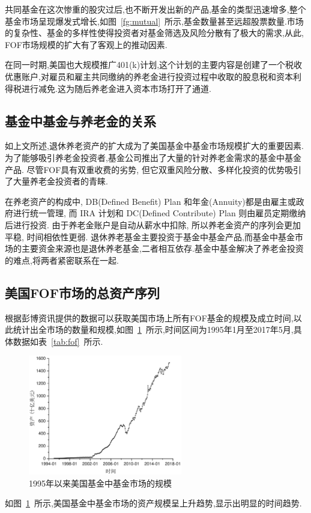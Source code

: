 共同基金在这次惨重的股灾过后,也不断开发出新的产品,基金的类型迅速增多,整个基金市场呈现爆发式增长,如图~\ref{fg:mutual}~所示,基金数量甚至远超股票数量.市场的复杂性、基金的多样性使得投资者对基金筛选及风险分散有了极大的需求,从此, FOF市场规模的扩大有了客观上的推动因素.

在同一时期,美国也大规模推广401(k)计划,这个计划的主要内容是创建了一个税收优惠账户,对雇员和雇主共同缴纳的养老金进行投资过程中收取的股息税和资本利得税进行减免.这为随后养老金进入资本市场打开了通道.

\subsection{基金中基金与养老金的关系\label{sec:retire}}

如上文所述,退休养老资产的扩大成为了美国基金中基金市场规模扩大的重要因素.为了能够吸引养老金投资者,基金公司推出了大量的针对养老金需求的基金中基金产品. 尽管FOF具有双重收费的劣势, 但它双重风险分散、多样化投资的优势吸引了大量养老金投资者的青睐.

在养老资产的构成中, DB(Defined Benefit) Plan 和年金(Annuity)都是由雇主或政府进行统一管理, 而 IRA 计划和 DC(Defined Contribute) Plan 则由雇员定期缴纳后进行投资. 由于养老金账户是自动从薪水中扣除, 所以养老金资产的序列会更加平稳, 时间相依性更弱. 退休养老基金主要投资于基金中基金产品,而基金中基金市场的主要资金来源也是退休养老基金,二者相互依存.基金中基金解决了养老金投资的难点,将两者紧密联系在一起.

\subsection{美国FOF市场的总资产序列}
根据彭博资讯提供的数据可以获取美国市场上所有FOF基金的规模及成立时间,以此统计出全市场的数量和规模,如图~\ref{fg:fof}~所示,时间区间为1995年1月至2017年5月,具体数据如表~\ref{tab:fof}~所示.
\begin{figure}[ht]
  \centering
  \includegraphics[width=0.6\textwidth]{pic/fof.pdf}
  \caption{1995年以来美国基金中基金市场的规模}\label{fg:fof}
\end{figure}

如图~\ref{fg:fof}~所示,美国基金中基金市场的资产规模呈上升趋势,显示出明显的时间趋势.